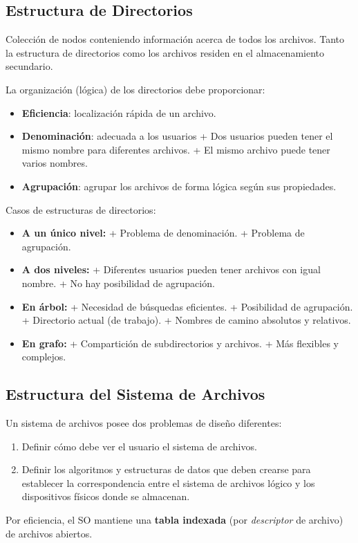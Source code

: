 \documentclass[10pt,a4paper]{article}
\begin{document}
\subsection{Estructura de Directorios}
Colección de nodos conteniendo información acerca de todos los archivos. Tanto la estructura de directorios como los archivos residen en el almacenamiento secundario.

La organización (lógica) de los directorios
debe proporcionar:
\begin{itemize}
\item \textbf{Eficiencia}: localización rápida de un archivo.
\item \textbf{Denominación}: adecuada a los usuarios
\subitem + Dos usuarios pueden tener el mismo nombre para diferentes archivos.
\subitem + El mismo archivo puede tener varios nombres.
\item \textbf{Agrupación}: agrupar los archivos de forma lógica según sus propiedades.
\end{itemize}

Casos de estructuras de directorios:
\begin{itemize}
\item \textbf{A un único nivel:}
\subitem + Problema de denominación.
\subitem + Problema de agrupación.
\item \textbf{A dos niveles:}
\subitem + Diferentes usuarios pueden tener archivos con igual nombre.
\subitem + No hay posibilidad de agrupación.
\item \textbf{En árbol:}
\subitem + Necesidad de búsquedas eficientes.
\subitem + Posibilidad de agrupación.
\subitem + Directorio actual (de trabajo).
\subitem + Nombres de camino absolutos y relativos.
\item \textbf{En grafo:}
\subitem + Compartición de subdirectorios y archivos.
\subitem + Más flexibles y complejos.
\end{itemize}

\subsection{Estructura del Sistema de Archivos}
Un sistema de archivos posee dos problemas de diseño diferentes:
\begin{enumerate}
\item Definir cómo debe ver el usuario el sistema de archivos.
\item Definir los algoritmos y estructuras de datos que deben crearse para establecer la correspondencia entre el sistema de archivos lógico y los dispositivos físicos donde se almacenan.
\end{enumerate}
Por eficiencia, el SO mantiene una \textbf{tabla indexada} (por \textit{descriptor} de
archivo) de archivos abiertos.
\end{document}
